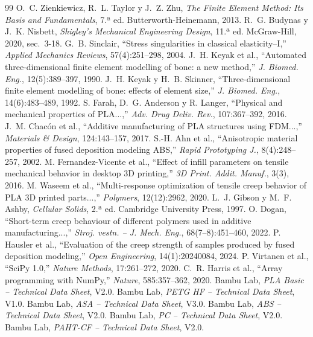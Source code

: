 \documentclass[11pt,a4paper]{article}
\begin{document}
\begin{thebibliography}{99}\small
{} O.~C. Zienkiewicz, R.~L. Taylor y J.~Z. Zhu, \emph{The Finite Element Method: Its Basis and Fundamentals}, 7.ª ed. Butterworth-Heinemann, 2013.
 R.~G. Budynas y J.~K. Nisbett, \emph{Shigley's Mechanical Engineering Design}, 11.ª ed. McGraw-Hill, 2020, sec.~3-18.
 G.~B. Sinclair, ``Stress singularities in classical elasticity--I,'' \emph{Applied Mechanics Reviews}, 57(4):251--298, 2004.
 J.~H. Keyak et al., ``Automated three-dimensional finite element modelling of bone: a new method,'' \emph{J. Biomed. Eng.}, 12(5):389--397, 1990.
 J.~H. Keyak y H.~B. Skinner, ``Three-dimensional finite element modelling of bone: effects of element size,'' \emph{J. Biomed. Eng.}, 14(6):483--489, 1992.
 S. Farah, D.~G. Anderson y R. Langer, ``Physical and mechanical properties of PLA...,'' \emph{Adv. Drug Deliv. Rev.}, 107:367--392, 2016.
 J.~M. Chacón et al., ``Additive manufacturing of PLA structures using FDM...,'' \emph{Materials \& Design}, 124:143--157, 2017.
 S.-H. Ahn et al., ``Anisotropic material properties of fused deposition modeling ABS,'' \emph{Rapid Prototyping J.}, 8(4):248--257, 2002.
 M. Fernandez-Vicente et al., ``Effect of infill parameters on tensile mechanical behavior in desktop 3D printing,'' \emph{3D Print. Addit. Manuf.}, 3(3), 2016.
 M. Waseem et al., ``Multi-response optimization of tensile creep behavior of PLA 3D printed parts...,'' \emph{Polymers}, 12(12):2962, 2020.
 L.~J. Gibson y M.~F. Ashby, \emph{Cellular Solids}, 2.ª ed. Cambridge University Press, 1997.
 O. Dogan, ``Short-term creep behaviour of different polymers used in additive manufacturing...,'' \emph{Stroj. vestn. -- J. Mech. Eng.}, 68(7--8):451--460, 2022.
 P. Hausler et al., ``Evaluation of the creep strength of samples produced by fused deposition modeling,'' \emph{Open Engineering}, 14(1):20240084, 2024.
 P. Virtanen et al., ``SciPy 1.0,'' \emph{Nature Methods}, 17:261--272, 2020.
 C.~R. Harris et al., ``Array programming with NumPy,'' \emph{Nature}, 585:357--362, 2020.
 Bambu Lab, \emph{PLA Basic -- Technical Data Sheet}, V2.0.
 Bambu Lab, \emph{PETG HF -- Technical Data Sheet}, V1.0.
 Bambu Lab, \emph{ASA -- Technical Data Sheet}, V3.0.
 Bambu Lab, \emph{ABS -- Technical Data Sheet}, V2.0.
 Bambu Lab, \emph{PC -- Technical Data Sheet}, V2.0.
 Bambu Lab, \emph{PAHT-CF -- Technical Data Sheet}, V2.0.
\end{thebibliography}
\end{document}
